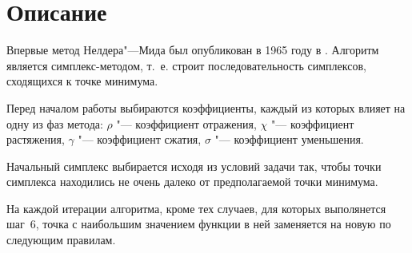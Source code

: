 \documentclass[12pt]{article}
\theoremstyle{plain}
\theoremstyle{remark}
\theoremstyle{definition}
\begin{document}
\section{Описание}
Впервые метод Нелдера"---Мида был опубликован в 1965 году в \cite{origin}. Алгоритм является симплекс-методом, т.~е. строит последовательность симплексов, сходящихся к точке минимума.

Перед началом работы выбираются коэффициенты, каждый из которых влияет на одну из фаз метода: $\rho$ "--- коэффициент отражения, $\chi$ "--- коэффициент растяжения, $\gamma$ "--- коэффициент сжатия, $\sigma$ "--- коэффициент уменьшения.

Начальный симплекс выбирается исходя из условий задачи так, чтобы точки симплекса находились не очень далеко от предполагаемой точки минимума.

На каждой итерации алгоритма, кроме тех случаев, для которых выполянется шаг~6, точка с наибольшим значением функции в ней заменяется на новую по следующим правилам.
\end{document}
